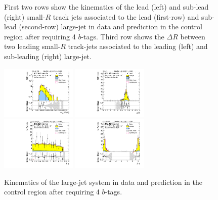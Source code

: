 \begin{figure}[htbp!]
\begin{center}
  \caption{First two rows show the kinematics of the lead (left) and sub-lead (right) small-$R$ track jets associated to the lead (first-row) and sub-lead (second-row) large-\R jet in data and prediction in the control region after requiring 4 $b$-tags. Third row shows the $\Delta R$ between two leading small-$R$ track-jets associated to the leading (left) and sub-leading (right) large-\R jet.  }
  \label{fig:boosted-4b-control-ak2}
\end{center}
\end{figure}


\begin{figure}[htbp!]
\begin{center}
\includegraphics[width=0.32\textwidth,angle=-90]{figures/boosted/Control/b77_FourTag_Control_mHH_l_1.pdf}
\includegraphics[width=0.32\textwidth,angle=-90]{figures/boosted/Control/b77_FourTag_Control_hCandDr.pdf}\\
\includegraphics[width=0.32\textwidth,angle=-90]{figures/boosted/Control/b77_FourTag_Control_hCandDeta.pdf}
\includegraphics[width=0.32\textwidth,angle=-90]{figures/boosted/Control/b77_FourTag_Control_hCandDphi.pdf}
  \caption{Kinematics of the large-\R jet system in data and prediction in the control region after requiring 4 $b$-tags.  }
  \label{fig:boosted-4b-control-ak10-system}
\end{center}
\end{figure}

